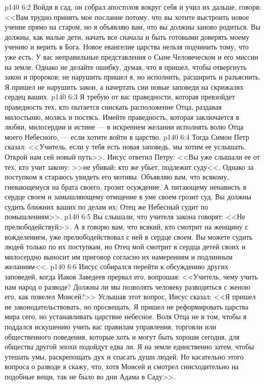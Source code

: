 \vs p140 6:2 Войдя в сад, он собрал апостолов вокруг себя и учил их дальше, говоря: <<Вам трудно принять мое послание потому, что вы хотите выстроить новое учение прямо на старом, но я объявляю вам, что вы должны заново родиться. Вы должны, как малые дети, начать все сначала и быть готовыми доверять моему учению и верить в Бога. Новое евангелие царства нельзя подчинить тому, что уже есть. У вас неправильные представления о Сыне Человеческом и его миссии на земле. Однако не делайте ошибку, думая, что я пришел, чтобы отвергнуть закон и пророков; не нарушить пришел я, но исполнить, расширить и разъяснить. Я пришел не нарушить закон, а начертать сии новые заповеди на скрижалях сердец ваших.
\vs p140 6:3 Я требую от вас праведности, которая превзойдет праведность тех, кто пытается снискать расположение Отца, раздавая милостыню, молясь и постясь. Имейте праведность, которая заключается в любви, милосердии и истине --- в искреннем желании исполнять волю Отца моего Небесного, --- если хотите войти в царство.
\vs p140 6:4 Тогда Симон Петр сказал: <<Учитель, если у тебя есть новая заповедь, мы хотим ее услышать. Открой нам сей новый путь>>. Иисус ответил Петру: <<Вы уже слышали ее от тех, кто учит закону: >>не убивай; кто же убьет, подлежит суду<<. Однако за поступком я стараюсь увидеть его мотивы. Объявляю вам, что всякому, гневающемуся на брата своего, грозит осуждение. А питающему ненависть в сердце своем и замышляющему отмщение в уме своем грозит суд. Вы должны судить ближних ваших по делам их; Отец же Небесный судит по помышлениям>>.
\vs p140 6:5 Вы слышали, что учителя закона говорят: <<Не прелюбодействуй>>. А я говорю вам, что всякий, кто смотрит на женщину с вожделением, уже прелюбодействовал с ней в сердце своем. Вы можете судить людей только по их поступкам, но Отец мой смотрит в сердца детей своих и милосердно выносит им приговор согласно их намерениям и подлинным желаниям<<.
\vs p140 6:6 Иисус собирался перейти к обсуждению других заповедей, когда Иаков Заведеев прервал его, вопрошая: <<Учитель, чему учить нам народ о разводе? Должны ли мы позволять человеку разводиться с женою его, как повелел Моисей?>> Услышав этот вопрос, Иисус сказал: <<Я пришел не законодательствовать, но просвещать. Я пришел не реформировать царства мира сего, но устанавливать царствие небесное. Воля Отца не в том, чтобы я поддался искушению учить вас правилам управления, торговли или общественного поведения, которые хоть и могут быть хороши сегодня, для общества другой эпохи подойдут едва ли. Я на земле единственно затем, чтобы утешать умы, раскрепощать дух и спасать души людей. Но касательно этого вопроса о разводе я скажу, что, хотя Моисей и смотрел снисходительно на подобные вещи, так не было во дни Адама в Саду>>.
